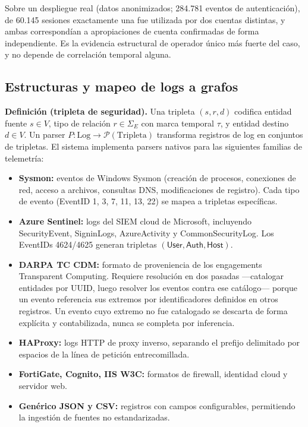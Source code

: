 \documentclass[11pt,a4paper]{article}
\begin{document}
Sobre un despliegue real (datos anonimizados; 284.781 eventos de
autenticación), de 60.145 sesiones exactamente una fue utilizada por dos
cuentas distintas, y ambas correspondían a apropiaciones de cuenta confirmadas
de forma independiente. Es la evidencia estructural de operador único más
fuerte del caso, y no depende de correlación temporal alguna.

\subsection{Estructuras y mapeo de logs a grafos}
\textbf{Definición (tripleta de seguridad).} Una tripleta $(s, r, d)$ codifica
entidad fuente $s \in V$, tipo de relación $r \in \Sigma_E$ con marca temporal
$\tau$, y entidad destino $d \in V$. Un parser
$P : \mathrm{Log} \to \mathcal{P}(\mathrm{Tripleta})$ transforma registros de
log en conjuntos de tripletas. El sistema implementa parsers nativos para las
siguientes familias de telemetría:

\begin{itemize}[leftmargin=*]
  \item \textbf{Sysmon:} eventos de Windows Sysmon (creación de procesos,
  conexiones de red, acceso a archivos, consultas DNS, modificaciones de
  registro). Cada tipo de evento (EventID 1, 3, 7, 11, 13, 22) se mapea a
  tripletas específicas.
  \item \textbf{Azure Sentinel:} logs del SIEM cloud de Microsoft, incluyendo
  SecurityEvent, SigninLogs, AzureActivity y CommonSecurityLog. Los EventIDs
  4624/4625 generan tripletas $(\mathsf{User}, \mathsf{Auth}, \mathsf{Host})$.
  \item \textbf{DARPA TC CDM:} formato de proveniencia de los engagements
  Transparent Computing. Requiere resolución en dos pasadas ---catalogar
  entidades por UUID, luego resolver los eventos contra ese catálogo--- porque
  un evento referencia sus extremos por identificadores definidos en otros
  registros. Un evento cuyo extremo no fue catalogado se descarta de forma
  explícita y contabilizada, nunca se completa por inferencia.
  \item \textbf{HAProxy:} logs HTTP de proxy inverso, separando el prefijo
  delimitado por espacios de la línea de petición entrecomillada.
  \item \textbf{FortiGate, Cognito, IIS W3C:} formatos de firewall, identidad
  cloud y servidor web.
  \item \textbf{Genérico JSON y CSV:} registros con campos configurables,
  permitiendo la ingestión de fuentes no estandarizadas.
\end{itemize}
\end{document}
